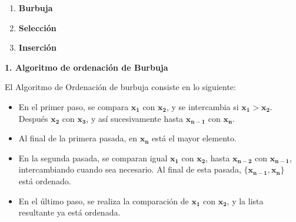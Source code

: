 \documentclass[twoside]{report}
\newcommand{\celeste}[1]{\textcolor{cyan}{#1}}
\newcommand{\bs}[1]{\boldsymbol{#1}}
\begin{document}
    \begin{enumerate}
        \item \textbf{Burbuja}
        \item \textbf{Selección}
        \item \textbf{Inserción}
    \end{enumerate}




\textbf{1. Algoritmo de ordenación de Burbuja}

 \vspace{0.5cm}
 El Algoritmo de Ordenación de burbuja consiste en lo siguiente:
        \begin{itemize}
            \item En el primer paso, se compara $\bs{x_1}$ con $\bs{x_2}$, y se intercambia si $\bs{x_1>x_2}$. Después $\bs{x_2}$ con $\bs{x_3}$, y así sucesivamente hasta $\bs{x_{n-1}}$ con $\bs{x_n}$.
            \item Al final de la primera pasada, en $\bs{x_n}$ está el mayor elemento.
            \item En la segunda pasada, se comparan igual $\bs{x_1}$ con $\bs{x_2}$, hasta $\bs{x_{n-2}}$ con $\bs{x_{n-1}}$, intercambiando cuando sea necesario. Al final de esta pasada, $\bs{\{x_{n-1},x_n\}}$ está ordenado.
            \item En el último paso, se realiza la comparación de $\bs{x_1}$ con $\bs{x_2}$, y la lista resultante ya está ordenada.
        \end{itemize}

\vspace*{0.5cm}
\end{document}
